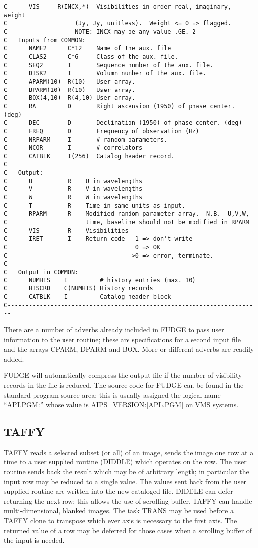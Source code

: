 \begin{verbatim}
C      VIS     R(INCX,*)  Visibilities in order real, imaginary, weight
C                   (Jy, Jy, unitless).  Weight <= 0 => flagged.
C                   NOTE: INCX may be any value .GE. 2
C   Inputs from COMMON:
C      NAME2      C*12    Name of the aux. file
C      CLAS2      C*6     Class of the aux. file.
C      SEQ2       I       Sequence number of the aux. file.
C      DISK2      I       Volumn number of the aux. file.
C      APARM(10)  R(10)   User array.
C      BPARM(10)  R(10)   User array.
C      BOX(4,10)  R(4,10) User array.
C      RA         D       Right ascension (1950) of phase center. (deg)
C      DEC        D       Declination (1950) of phase center. (deg)
C      FREQ       D       Frequency of observation (Hz)
C      NRPARM     I       # random parameters.
C      NCOR       I       # correlators
C      CATBLK     I(256)  Catalog header record.
C
C   Output:
C      U          R    U in wavelengths
C      V          R    V in wavelengths
C      W          R    W in wavelengths
C      T          R    Time in same units as input.
C      RPARM      R    Modified random parameter array.  N.B.  U,V,W,
C                      time, baseline should not be modified in RPARM
C      VIS        R    Visibilities
C      IRET       I    Return code  -1 => don't write
C                                    0 => OK
C                                   >0 => error, terminate.
C
C   Output in COMMON:
C      NUMHIS    I         # history entries (max. 10)
C      HISCRD    C(NUMHIS) History records
C      CATBLK    I         Catalog header block
C-----------------------------------------------------------------------

\end{verbatim}
 There are a number of adverbs already included in FUDGE to pass user
information to the user routine; these are specifications for a second
input file and the arrays CPARM, DPARM and BOX.  More or different
adverbs are readily added.

FUDGE will automatically compress the output file if the number of
visibility records in the file is reduced. The source code for FUDGE
can be found in the standard program source area; this is usually
assigned the logical name ``APLPGM:'' whose value is
AIPS\_VERSION:[APL.PGM] on VMS systems.

\subsection{TAFFY}
TAFFY reads a selected subset (or all) of an image, sends the image
one row at a time to a user supplied routine (DIDDLE) which operates
on the row.  The user routine sends back the result which may be of
arbitrary length; in particular the input row may be reduced to a
single value. The values sent back from the user supplied routine are
written into the new cataloged file.  DIDDLE can defer returning the
next row; this allows the use of scrolling buffer. TAFFY can handle
multi-dimensional, blanked images. The task TRANS may be used before a
TAFFY clone to transpose which ever axis is necessary to the first
axis.  The returned value of a row may be deferred for those cases
when a scrolling buffer of the input is needed.

